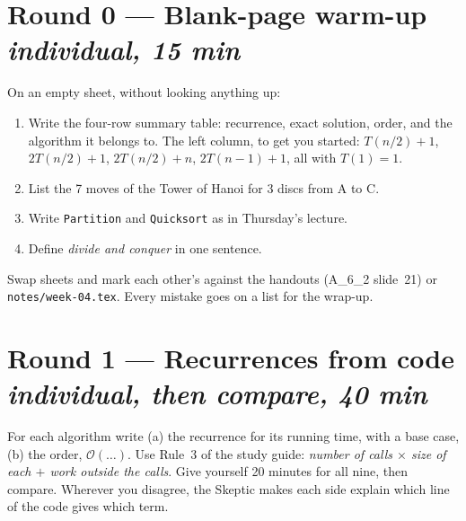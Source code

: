 \documentclass{fkt-notes}
\newcommand{\Oh}{\mathcal{O}}
\begin{document}
\section*{Round 0 --- Blank-page warm-up \hfill\normalsize\emph{individual, 15 min}}

On an empty sheet, without looking anything up:
\begin{enumerate}[label=\textbf{0.\arabic*},leftmargin=2.5em]
  \item Write the four-row summary table: recurrence, exact solution, order, and the algorithm it belongs to. The left column, to get you started: $T(n/2)+1$, $2T(n/2)+1$, $2T(n/2)+n$, $2T(n-1)+1$, all with $T(1)=1$.
  \item List the 7 moves of the Tower of Hanoi for 3 discs from A to C.
  \item Write \texttt{Partition} and \texttt{Quicksort} as in Thursday's lecture.
  \item Define \emph{divide and conquer} in one sentence.
\end{enumerate}
Swap sheets and mark each other's against the handouts (A\_6\_2 slide~21) or \texttt{notes/week-04.tex}. Every mistake goes on a list for the wrap-up.

\section*{Round 1 --- Recurrences from code \hfill\normalsize\emph{individual, then compare, 40 min}}

For each algorithm write (a) the recurrence for its running time, with a base case, (b) the order, $\Oh(\dots)$. Use Rule~3 of the study guide: \emph{number of calls $\times$ size of each $+$ work outside the calls}. Give yourself 20 minutes for all nine, then compare. Wherever you disagree, the Skeptic makes each side explain which line of the code gives which term.
\end{document}
